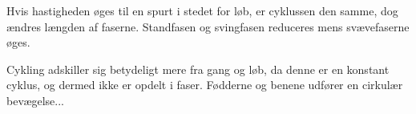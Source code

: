 Hvis hastigheden øges til en spurt i stedet for løb, er cyklussen den samme, dog ændres længden af faserne. Standfasen og svingfasen reduceres mens svævefaserne øges. \citep{Lee1998}

Cykling adskiller sig betydeligt mere fra gang og løb, da denne er en konstant cyklus, og dermed ikke er opdelt i faser. Fødderne og benene udfører en cirkulær bevægelse...








